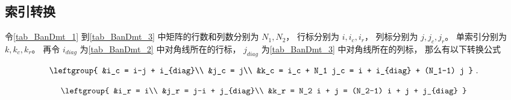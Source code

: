 \subsection{索引转换}

令\autoref{tab_BanDmt_1} 到\autoref{tab_BanDmt_3} 中矩阵的行数和列数分别为 $N_1, N_2$， 行标分别为 $i, i_c, i_r$， 列标分别为 $j, j_c, j_r$。 单索引分别为 $k, k_c, k_r$。 再令 $i_{diag}$ 为\autoref{tab_BanDmt_2} 中对角线所在的行标， $j_{diag}$ 为\autoref{tab_BanDmt_3} 中对角线所在的列标， 那么有以下转换公式

\begin{equation}
\leftgroup{
&i_c = i-j + i_{diag}\\
&j_c = j\\
&k_c = i_c + N_1 j_c = i + i_{diag} + (N_1-1) j
}~.\end{equation}

\begin{equation}
\leftgroup{
&i_r = i\\
&j_r = j-i + j_{diag}\\
&k_r = N_2 i + j = (N_2-1) i + j + j_{diag}
}\end{equation}
